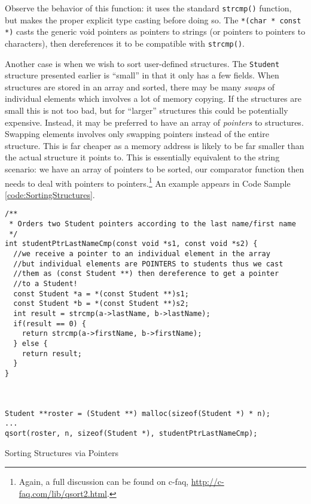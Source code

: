 Observe the behavior of this function: it uses the standard 
\texttt{strcmp()} function, but makes the proper explicit type 
casting before doing so.  The \texttt{*(char * const *)} casts 
the generic void pointers as pointers to strings (or pointers to 
pointers to characters), then dereferences it to be compatible
with \texttt{strcmp()}.

Another case is when we wish to sort user-defined structures.  The 
\texttt{Student} structure presented earlier is ``small'' in 
that it only has a few fields.  When structures are stored in an 
array and sorted, there may be many \emph{swaps} of individual 
elements which involves a lot of memory copying.  If the structures 
are small this is not too bad, but for ``larger'' structures this 
could be potentially expensive.  Instead, it may be preferred to 
have an array of \emph{pointers} to structures.  Swapping elements 
involves only swapping pointers instead of the entire structure.  
This is far cheaper as a memory address is likely to be far smaller 
than the actual structure it points to.  This is essentially 
equivalent to the string scenario: we have an array of pointers 
to be sorted, our comparator function then needs to deal with pointers 
to pointers.\footnote{Again, a full discussion can be found on c-faq,
\url{http://c-faq.com/lib/qsort2.html}.}  An example appears in Code 
Sample \ref{code:SortingStructures}.

\begin{listing}[H]
\begin{verbatim}
/**
 * Orders two Student pointers according to the last name/first name
 */
int studentPtrLastNameCmp(const void *s1, const void *s2) {
  //we receive a pointer to an individual element in the array
  //but individual elements are POINTERS to students thus we cast 
  //them as (const Student **) then dereference to get a pointer 
  //to a Student!
  const Student *a = *(const Student **)s1;
  const Student *b = *(const Student **)s2;
  int result = strcmp(a->lastName, b->lastName);
  if(result == 0) {
    return strcmp(a->firstName, b->firstName);
  } else {
    return result;
  }
}



Student **roster = (Student **) malloc(sizeof(Student *) * n);
...
qsort(roster, n, sizeof(Student *), studentPtrLastNameCmp);
\end{verbatim}
\caption{Sorting Structures via Pointers}
\label{code:SortingStructures}
\end{listing}

